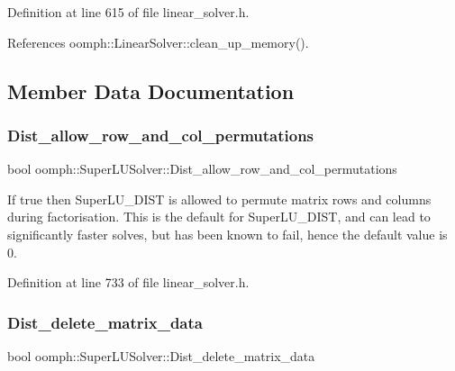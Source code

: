 Definition at line 615 of file linear\+\_\+solver.\+h.



References oomph\+::\+Linear\+Solver\+::clean\+\_\+up\+\_\+memory().



\subsection{Member Data Documentation}
\mbox{\label{classoomph_1_1SuperLUSolver_ab7477cbe49c517e2ee39ad6eedcf6f63}} 
\subsubsection{\texorpdfstring{Dist\+\_\+allow\+\_\+row\+\_\+and\+\_\+col\+\_\+permutations}{Dist\_allow\_row\_and\_col\_permutations}}
{\footnotesize\ttfamily bool oomph\+::\+Super\+L\+U\+Solver\+::\+Dist\+\_\+allow\+\_\+row\+\_\+and\+\_\+col\+\_\+permutations\hspace{0.3cm}{\ttfamily [private]}}



If true then Super\+L\+U\+\_\+\+D\+I\+ST is allowed to permute matrix rows and columns during factorisation. This is the default for Super\+L\+U\+\_\+\+D\+I\+ST, and can lead to significantly faster solves, but has been known to fail, hence the default value is 0. 



Definition at line 733 of file linear\+\_\+solver.\+h.

\mbox{\label{classoomph_1_1SuperLUSolver_a0c44f15dfab9ac11376a8272fcf0a3b4}} 
\subsubsection{\texorpdfstring{Dist\+\_\+delete\+\_\+matrix\+\_\+data}{Dist\_delete\_matrix\_data}}
{\footnotesize\ttfamily bool oomph\+::\+Super\+L\+U\+Solver\+::\+Dist\+\_\+delete\+\_\+matrix\+\_\+data\hspace{0.3cm}{\ttfamily [private]}}



